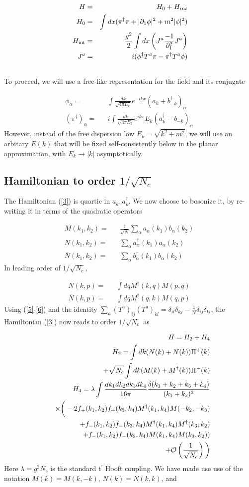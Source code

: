 \documentclass[showpacs,twocolumn,aps,preprintnumbers,letterpaper]{revtex4}
\newcommand{\be}{\begin{equation}}
\newcommand{\ee}{\end{equation}}
\def\be{\begin{eqnarray}}
\def\ee{\end{eqnarray}}
\begin{document}
\be
\label{3}
H=&&H_0+H_{int}\nonumber\\
H_0=&&\int dx(\pi^{\dagger}\pi+|\partial_1 \phi|^2+m^2|\phi|^2)\nonumber\\\
H_{\rm int}=&&\frac{g^2}{2}\int dx\left( J^{a}\frac{-1}{\partial_1^2}J^a\right)\nonumber\\
J^a=&&i(\phi^{\dagger}T^a\pi-\pi^{\dagger}T^a\phi)\nonumber\\\
\ee
To proceed, we will use a free-like representation for the field and its conjugate

\be
\label{4}
\phi_\alpha=&&\int\frac{dk}{\sqrt{4\pi E_k}}e^{-ikx}(a_k+b_{-k}^{\dagger})_{\alpha}\nonumber\\
(\pi^{\dagger})_{\alpha}=&&i\int \frac{dk}{\sqrt{4\pi E_k}}e^{ikx}E_k(a_k^{\dagger}-b_{-k})_{\alpha}
\ee
However, instead of the free dispersion law $E_k=\sqrt{k^2+m^2}$, we will use an arbitary 
$E(k)$ that  will be fixed self-consistently below in the planar approximation, with $E_k\rightarrow |k|$
asymptotically.





\subsection{Hamiltonian to order  $1/\sqrt{N_c}$}


The Hamiltonian (\ref{3}) is quartic in $a_k, a^\dagger_k$. We  now choose to bosonize it,
by re-writing it in terms of the quadratic operators

\be
\label{5}
M(k_1,k_2)=&&\frac{1}{\sqrt{N}}\sum_{\alpha}a_{\alpha}(k_1)b_{\alpha}(k_2)\nonumber\\
N(k_1,k_2)=&&\sum_{\alpha}a^{\dagger}_{\alpha}(k_1)a_{\alpha}(k_2)\nonumber\\
\bar N(k_1,k_2)=&&\sum_{\alpha}b^{\dagger}_{\alpha}(k_1)b_{\alpha}(k_2)
\ee
In leading order of $1/\sqrt{N_c}$, 

\be
\label{6}
N(k,p)=&&\int dq M^{\dagger}(k,q)M(p,q)\nonumber\\
\bar N(k,p)=&&\int dq M^{\dagger}(q,k)M(q,p)
\ee
Using (\ref{5}-\ref{6}) and the identity $\sum_a (T^a)_{ij} (T^a)_{kl}=\delta_{il}\delta_{kj}-\frac{1}{N}\delta_{ij}\delta_{kl}$,
the Hamiltonian (\ref{3}) now reads to order $1/\sqrt{N_c}$ as

\be
\label{7}
&&H=H_2+H_4\nonumber\\
&&H_2=\int dk (N(k)+\bar N(k))\Pi^{+}(k)\nonumber \\ 
&&+\sqrt{N_c}\int dk (M(k)+M^{\dagger}(k))\Pi^{-}(k)\nonumber\\
&&H_4=\lambda \int \frac{dk_1dk_2dk_3 dk_4}{16\pi}\frac{\delta(k_1+k_2+k_3+k_4)}{(k_1+k_2)^2}\nonumber \\ 
&&\times \bigg(-2f_+(k_1,k_2)f_+(k_3,k_4)M^{\dagger}(k_1,k_4)M(-k_2,-k_3)\nonumber \\
&&+f_-(k_1,k_2)f_-(k_3,k_4)M^{\dagger}(k_1,k_4)M^{\dagger}(k_3,k_2)\nonumber \\ 
&&+f_-(k_1,k_2)f_-(k_3,k_4)M(k_1,k_4)M(k_3,k_2))\nonumber\\
&&+{\cal O}\left(\frac{1}{\sqrt{N_c}}\right)\bigg)
\ee
Here $\lambda=g^2N_c$  is the standard t$^\prime$ Hooft coupling. We have made use use of the notation 
$M(k)=M(k,-k)$, $N(k)=N(k,k)$, and
\end{document}
